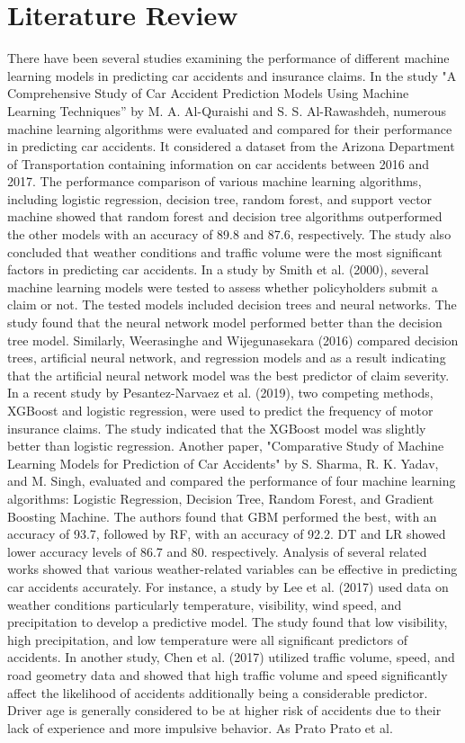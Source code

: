\documentclass{IEEEtran}
\begin{document}
\section{Literature Review}
There have been several studies examining the performance of different machine learning models in predicting car accidents and insurance claims. In the study "A Comprehensive Study of Car Accident Prediction Models Using Machine Learning Techniques'' by M. A. Al-Quraishi and S. S. Al-Rawashdeh, numerous machine learning algorithms were evaluated and compared for their performance in predicting car accidents. It considered a dataset from the Arizona Department of Transportation containing information on car accidents between 2016 and 2017. The performance comparison of various machine learning algorithms, including logistic regression, decision tree, random forest, and support vector machine showed that random forest and decision tree algorithms outperformed the other models with an accuracy of 89.8\text{\%} and 87.6\text{\%}, respectively. The study also concluded that weather conditions and traffic volume were the most significant factors in predicting car accidents. In a study by Smith et al. (2000), several machine learning models were tested to assess whether policyholders submit a claim or not. The tested models included decision trees and neural networks. The study found that the neural network model performed better than the decision tree model. Similarly, Weerasinghe and Wijegunasekara (2016) compared decision trees, artificial neural network, and regression models and  as a result indicating that the artificial neural network model was the best predictor of claim severity. In a recent study by Pesantez-Narvaez et al. (2019), two competing methods, XGBoost and logistic regression, were used to predict the frequency of motor insurance claims. The study indicated that the XGBoost model was slightly better than logistic regression. Another paper, "Comparative Study of Machine Learning Models for Prediction of Car Accidents" by S. Sharma, R. K. Yadav, and M. Singh, evaluated and compared the performance of four machine learning algorithms: Logistic Regression, Decision Tree, Random Forest, and Gradient Boosting Machine. The authors found that GBM performed the best, with an accuracy of 93.7\text{\%}, followed by RF, with an accuracy of 92.2\text{\%}. DT and LR showed lower accuracy levels of 86.7\text{\%} and 80.\text{\%} respectively.  Analysis of several related works showed that various weather-related variables can be effective in predicting car accidents accurately. For instance, a study by Lee et al. (2017) used data on weather conditions particularly temperature, visibility, wind speed, and precipitation to develop a predictive model. The study found that low visibility, high precipitation, and low temperature were all significant predictors of accidents. In another study, Chen et al. (2017) utilized traffic volume, speed, and road geometry data and showed that high traffic volume and speed significantly affect the likelihood of accidents additionally being a considerable  predictor. Driver age is generally considered to be at higher risk of accidents due to their lack of experience and more impulsive behavior. As Prato Prato et al. 
\end{document}
